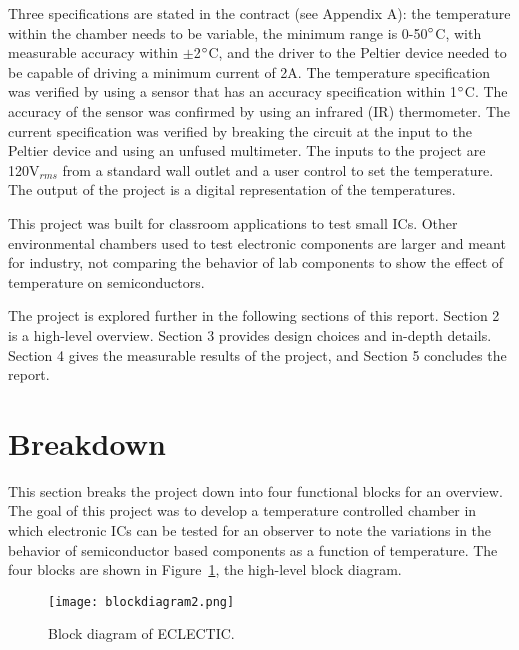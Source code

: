 \documentclass[11pt,letter]{article}
\providecommand{\DIFadd}[1]{{\protect\color{blue}\uwave{#1}}} %
\providecommand{\DIFaddbegin}{} %
\providecommand{\DIFaddend}{} %
\providecommand{\DIFaddbeginFL}{} %
\providecommand{\DIFaddendFL}{} %
\providecommand{\DIFdelbeginFL}{} %
\providecommand{\DIFdelendFL}{} %
\newcommand{\DIFscaledelfig}{0.5}
\newlength{\DIFdelgraphicswidth} %
\newlength{\DIFdelgraphicsheight} %
\newcommand{\DIFaddincludegraphics}[2][]{{\color{blue}\fbox{\DIFOincludegraphics[#1]{#2}}}} %
\newcommand{\DIFdelincludegraphics}[2][]{%
\sbox{\DIFdelgraphicsbox}{\DIFOincludegraphics[#1]{#2}}%
\settoboxwidth{\DIFdelgraphicswidth}{\DIFdelgraphicsbox} %
\settoboxtotalheight{\DIFdelgraphicsheight}{\DIFdelgraphicsbox} %
\scalebox{\DIFscaledelfig}{%
\parbox[b]{\DIFdelgraphicswidth}{\usebox{\DIFdelgraphicsbox}\\[-\baselineskip] \rule{\DIFdelgraphicswidth}{0em}}\llap{\resizebox{\DIFdelgraphicswidth}{\DIFdelgraphicsheight}{%
\setlength{\unitlength}{\DIFdelgraphicswidth}%
\begin{picture}(1,1)%
\thicklines\linethickness{2pt} %
{\color[rgb]{1,0,0}\put(0,0){\framebox(1,1){}}}%
{\color[rgb]{1,0,0}\put(0,0){\line( 1,1){1}}}%
{\color[rgb]{1,0,0}\put(0,1){\line(1,-1){1}}}%
\end{picture}%
}\hspace*{3pt}}} %
} %
\DeclareRobustCommand{\DIFaddbegin}{\DIFOaddbegin \let\includegraphics\DIFaddincludegraphics} %
\DeclareRobustCommand{\DIFaddend}{\DIFOaddend \let\includegraphics\DIFOincludegraphics} %
\DeclareRobustCommand{\DIFaddbeginFL}{\DIFOaddbeginFL \let\includegraphics\DIFaddincludegraphics} %
\DeclareRobustCommand{\DIFaddendFL}{\DIFOaddendFL \let\includegraphics\DIFOincludegraphics} %
\DeclareRobustCommand{\DIFdelbeginFL}{\DIFOdelbeginFL \let\includegraphics\DIFdelincludegraphics} %
\DeclareRobustCommand{\DIFdelendFL}{\DIFOaddendFL \let\includegraphics\DIFOincludegraphics} %
\begin{document}
Three specifications are stated in the contract (see Appendix A): the temperature within the chamber needs to be variable, the minimum range is 0-50$\degree$C, with measurable accuracy within $\pm$2$\degree$C, and the driver to the Peltier device needed to be capable of driving a minimum current of 2A. The temperature specification was verified by using a sensor that has an accuracy specification within 1$\degree$C. The accuracy of the sensor was confirmed by using an infrared (IR) thermometer. The current specification was verified by breaking the circuit at the input to the Peltier device and using an unfused multimeter. The inputs to the project are 120V$_{rms}$ from a standard wall outlet and a user control to set the temperature. The output of the project is a digital representation of the temperatures.   

This project was built for classroom applications to test small ICs. Other environmental chambers used to test electronic components are larger and meant for industry, not \DIFaddbegin \DIFadd{for }\DIFaddend comparing the behavior of lab components to show the effect of temperature on semiconductors. 

The project is explored further in the following sections of this report. Section 2 is a high-level overview. Section 3 provides design choices and in-depth details. Section 4 gives the measurable results of the project, and Section 5 concludes the report.
\section{Breakdown} %
This section breaks the project down into four functional blocks for an overview. The goal of this project was to develop a temperature controlled chamber in which electronic ICs can be tested for an observer to note the variations in the behavior of semiconductor based components as a function of temperature. The four blocks are shown in Figure~\ref{fig:blockdiagram}, the high-level block diagram.

\begin{figure}[H]
    \centering
    \DIFdelbeginFL %
\DIFdelendFL \DIFaddbeginFL \texttt{[image: blockdiagram2.png]}
    \DIFaddendFL \caption{Block diagram of ECLECTIC.}
    \label{fig:blockdiagram}
\end{figure}
\end{document}
